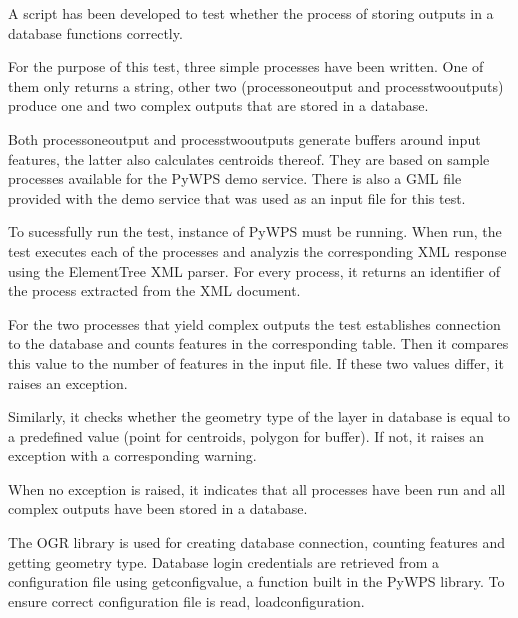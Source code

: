 A script has been developed to test whether the process of storing outputs in a database functions correctly.

For the purpose of this test, three simple processes have been written. One of them only returns a string, other two (process\textunderscore one\textunderscore output and process\textunderscore two\textunderscore outputs) produce one and two complex outputs that are stored in a database. 

Both process\textunderscore one\textunderscore output and process\textunderscore two\textunderscore outputs generate buffers around input features, the latter also calculates centroids thereof. They are based on sample processes available for the PyWPS demo service. There is also a GML file provided with the demo service that was used as an input file for this test.  

To sucessfully run the test, instance of PyWPS must be running. When run, the test executes each of the processes and analyzis the corresponding XML response using the ElementTree XML parser. For every process, it returns an identifier of the process extracted from the XML document. 

For the two processes that yield complex outputs the test establishes connection to the database and counts features in the corresponding table. Then it compares this value to the number of features in the input file. If these two values differ, it raises an exception.

Similarly, it checks whether the geometry type of the layer in database is equal to a predefined value (point for centroids, polygon for buffer). If not, it raises an exception with a corresponding warning. 

When no exception is raised, it indicates that all processes have been run and all complex outputs have been stored in a database.

The OGR library is used for creating database connection, counting features and getting geometry type. Database login credentials are retrieved from a configuration file using get\textunderscore config\textunderscore value, a function built in the PyWPS library. To ensure correct configuration file is read, load\textunderscore configuration.





